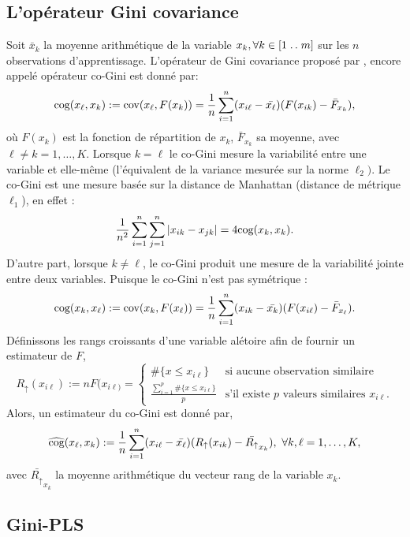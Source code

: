 \subsection{L'opérateur Gini covariance}

Soit $\bar{x}_k$ la moyenne arithmétique de la variable $x_k, \forall k \in [1\mathrel{{.}\,{.}}\nobreak m]$ sur les $n$ observations d'apprentissage. L'opérateur de Gini covariance proposé par \citet{Schechtman03}, encore appelé opérateur co-Gini est donné par:
\begin{equation}\label{cog0}
\text{cog}(x_\ell,x_k) := \text{cov}(x_\ell,F(x_k)) = \frac{1}{n}\sum_{i=1}^n(x_{i\ell} -\bar{x_\ell})(F(x_{ik})-\bar{F}_{x_k}),
\end{equation}
où $F(x_{k})$ est la fonction de répartition de $x_k$, $\bar{F}_{x_k}$ sa moyenne, avec $\ell \neq k = 1,\ldots,K$. Lorsque $k=\ell$ le co-Gini mesure la variabilité entre une variable et elle-même (l'équivalent de la variance mesurée sur la norme $\ell_2)$. Le co-Gini est une mesure basée sur la distance de Manhattan (distance de métrique $\ell_1$), en effet :
\begin{equation}\notag
\frac{1}{n^2}\sum_{i=1}^n\sum_{j=1}^n |x_{ik} - x_{jk}| = 4\text{cog}(x_k,x_k).
\end{equation}
D'autre part, lorsque $k\neq \ell$, le co-Gini produit une mesure de la variabilité jointe entre deux variables. Puisque le co-Gini n'est pas symétrique :
\[
\text{cog}(x_k,x_\ell) := \text{cov}(x_k ,F(x_\ell)) = \frac{1}{n}\sum_{i=1}^n(x_{ik} -\bar{x_k})(F(x_{i\ell})-\bar{F}_{x_\ell}).
\]
Définissons les rangs croissants d'une variable alétoire afin de fournir un estimateur de $F$,
\[
R_\uparrow(x_{i\ell}) := nF(x_{i\ell)} = 
\left\{ \begin{array}{ll}
\#\{ x \leq x_{i\ell} \} & \text{si aucune observation similaire} \\
\frac{\sum_{i=1}^p\#\{ x \leq x_{i\ell} \}}{p} & \text{s'il existe $p$ valeurs similaires $x_{i\ell}$.}
\end{array}
\right.
\]
Alors, un estimateur du co-Gini est donné par,
\begin{eqnarray}\label{cog}
\widehat{\text{cog}}(x_\ell,x_k) := \frac{1}{n}\sum_{i=1}^n(x_{i\ell} -\bar{x_\ell})(R_\uparrow(x_{ik})-\bar{R_\uparrow}_{x_k}), \ \forall k,\ell=1,\ldots,K,
\end{eqnarray}
avec $\bar{R_\uparrow}_{x_k}$ la moyenne arithmétique du vecteur rang de la variable $x_k$. 


\subsection{Gini-PLS}

